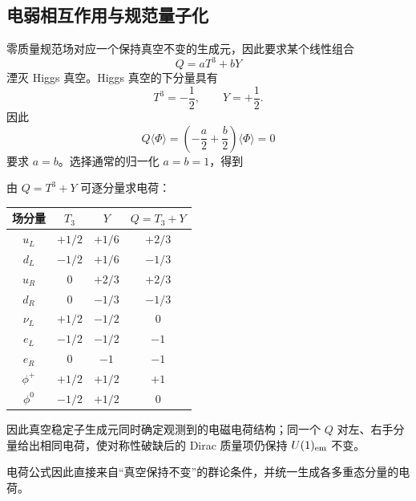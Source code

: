 \subsection{电弱相互作用与规范量子化}

\begin{proposition}[电荷生成元来自真空稳定子]
零质量规范场对应一个保持真空不变的生成元，因此要求某个线性组合
\begin{equation*}
 Q=aT^3+bY
\end{equation*}
湮灭 Higgs 真空。Higgs 真空的下分量具有
\begin{equation*}
 T^3=-\frac12,
 \qquad Y=+\frac12.
\end{equation*}
因此
\begin{equation*}
 Q\langle\Phi\rangle
 =\left(-\frac a2+\frac b2\right)\langle\Phi\rangle=0
\end{equation*}
要求 $a=b$。选择通常的归一化 $a=b=1$，得到

由 $Q=T^3+Y$ 可逐分量求电荷：
\begin{center}
\begin{tabular}{c|c|c|c}
场分量 & $T_3$ & $Y$ & $Q=T_3+Y$\\
\hline
$u_L$ & $+1/2$ & $+1/6$ & $+2/3$\\
$d_L$ & $-1/2$ & $+1/6$ & $-1/3$\\
$u_R$ & $0$ & $+2/3$ & $+2/3$\\
$d_R$ & $0$ & $-1/3$ & $-1/3$\\
$\nu_L$ & $+1/2$ & $-1/2$ & $0$\\
$e_L$ & $-1/2$ & $-1/2$ & $-1$\\
$e_R$ & $0$ & $-1$ & $-1$\\
$\phi^+$ & $+1/2$ & $+1/2$ & $+1$\\
$\phi^0$ & $-1/2$ & $+1/2$ & $0$
\end{tabular}
\end{center}
因此真空稳定子生成元同时确定观测到的电磁电荷结构；同一个 $Q$ 对左、右手分量给出相同电荷，使对称性破缺后的 Dirac 质量项仍保持 $U(1)_{\rm em}$ 不变。

电荷公式因此直接来自“真空保持不变”的群论条件，并统一生成各多重态分量的电荷。
\end{proposition}

